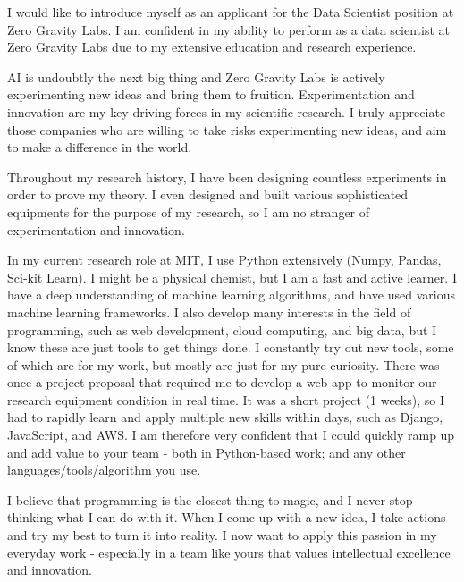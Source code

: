 \documentclass[11pt, letterpaper]{awesome-cv}
\begin{document}
\begin{cvletter}



I would like to introduce myself as an applicant for the Data Scientist
position at Zero Gravity Labs. I am confident in my ability to perform as a data
scientist at Zero Gravity Labs due to my extensive education and research experience.


AI is undoubtly the next big thing and Zero Gravity Labs is actively
experimenting new ideas and bring them to fruition. Experimentation and
innovation are my key driving forces in my scientific research. I truly
appreciate those companies who are willing to take risks experimenting new
ideas, and aim to make a difference in the world.


Throughout my research history, I have been designing countless experiments in
order to prove my theory. I even designed and built various sophisticated
equipments for the purpose of my research, so I am no stranger of
experimentation and innovation.

In my current research role at MIT, I use Python extensively (Numpy, Pandas,
Sci-kit Learn). I might be a physical chemist, but I am a fast and active
learner. I have a deep understanding of machine learning algorithms, and have
used various machine learning frameworks. I also develop many interests in the
field of programming, such as web development, cloud computing, and big data,
but I know these are just tools to get things done. I constantly try out new
tools, some of which are for my work, but mostly are just for my pure curiosity.
There was once a project proposal that required me to develop a web app
to monitor our research equipment condition in real time. It was a short project
(1 weeks), so I had to rapidly learn and apply multiple new skills within days,
such as Django, JavaScript, and AWS. I am therefore very confident that I could
quickly ramp up and add value to your team - both in Python-based work; and any
other languages/tools/algorithm you use.

I believe that programming is the closest thing to magic, and I never stop
thinking what I can do with it. When I come up with a new idea, I take actions
and try my best to turn it into reality. I now want to apply this
passion in my everyday work - especially in a team like yours that values
intellectual excellence and innovation.


\end{cvletter}


\makeletterclosing
\end{document}
